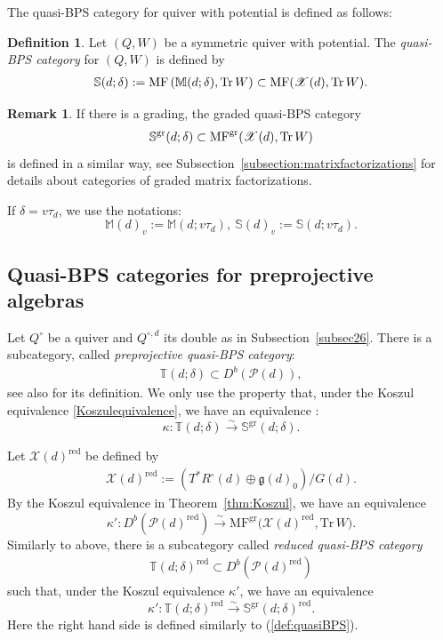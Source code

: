 \documentclass [11pt,oneside,a4paper,mathscr]{amsart}
\theoremstyle{definition}
\newtheorem{defn}[thm]{Definition}
\newtheorem{remark}[thm]{Remark}
\newcommand{\X}{\mathscr{X}}
\newcommand{\Tr}{\mathop{\rm Tr}}
\begin{document}
The quasi-BPS category for quiver
with potential is defined as follows: 
\begin{defn}
    Let $(Q, W)$ be a symmetric quiver with potential. 
The \textit{quasi-BPS category} for $(Q, W)$ is defined by 
    \begin{align}\label{def:quasiBPS}
\mathbb{S}(d; \delta):=\mathrm{MF}\left(\mathbb{M}(d; \delta), \mathrm{Tr}\,W\right) \subset 
\mathrm{MF}(\X(d), \Tr W). 
\end{align}
\end{defn}
\begin{remark}
If there is a grading, the graded quasi-BPS 
category 
\begin{align*}
    \mathbb{S}^{\rm{gr}}(d; \delta) \subset 
    \mathrm{MF}^{\rm{gr}}(\X(d), \Tr W)
\end{align*}
is defined in a similar way, see Subsection~\ref{subsection:matrixfactorizations} for details about categories of graded matrix factorizations. 
\end{remark}
If $\delta=v\tau_d$, we use the notations:
\[\mathbb{M}(d)_v:=\mathbb{M}(d; v\tau_d), \ 
\mathbb{S}(d)_v:=\mathbb{S}(d; v\tau_d).\]

\subsection{Quasi-BPS categories for preprojective algebras}\label{subsec:qbps:pre}
Let $Q^{\circ}$ be a quiver and $Q^{\circ, d}$ its double as in 
Subsection~\ref{subsec26}. 
There is a subcategory, 
called \textit{preprojective quasi-BPS category}:
\begin{align*}\mathbb{T}(d; \delta)\subset D^b(\mathscr{P}(d)),
\end{align*}
see also \cite[Definition 2.14]{PTquiver} for its 
definition. 
We only use the property that, under the Koszul equivalence \eqref{Koszulequivalence}, 
we have an equivalence :
\begin{equation}\label{kappamagic}
\kappa\colon \mathbb{T}(d; \delta)\xrightarrow{\sim} \mathbb{S}^{\mathrm{gr}}(d; \delta). 
\end{equation}


Let 
$\X(d)^{\mathrm{red}}$ be defined by 
\begin{align*}
\X(d)^{\mathrm{red}}:=(T^* R^\circ(d)\oplus \mathfrak{g}(d)_0)/G(d).
\end{align*}
By the Koszul equivalence in Theorem~\ref{thm:Koszul}, we have 
an equivalence 
\[\kappa'\colon D^b(\mathscr{P}(d)^{\mathrm{red}})\xrightarrow{\sim} \mathrm{MF}^{\mathrm{gr}}\big(\X(d)^{\mathrm{red}}, \mathrm{Tr}\,W\big).\]
Similarly to above, 
there is a subcategory 
called \textit{reduced quasi-BPS category}
\begin{align*}
 \mathbb{T}(d; \delta)^{\mathrm{red}}\subset D^b(\mathscr{P}(d)^{\mathrm{red}})   
\end{align*}
such that, under the Koszul equivalence $\kappa'$, we have an equivalence 
\[\kappa'\colon \mathbb{T}(d; \delta)^{\mathrm{red}}\xrightarrow{\sim} \mathbb{S}^{\mathrm{gr}}(d; \delta)^{\mathrm{red}}.\]
Here the right hand side is defined similarly to (\ref{def:quasiBPS}). 
\end{document}
